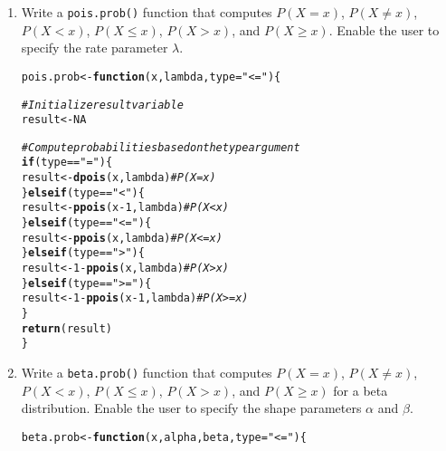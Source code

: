 \documentclass{article}\usepackage[]{graphicx}\usepackage[]{xcolor}
\makeatletter
\newcommand{\hlnum}[1]{\textcolor[rgb]{0.686,0.059,0.569}{#1}}%
\newcommand{\hlsng}[1]{\textcolor[rgb]{0.192,0.494,0.8}{#1}}%
\newcommand{\hlcom}[1]{\textcolor[rgb]{0.678,0.584,0.686}{\textit{#1}}}%
\newcommand{\hlopt}[1]{\textcolor[rgb]{0,0,0}{#1}}%
\newcommand{\hldef}[1]{\textcolor[rgb]{0.345,0.345,0.345}{#1}}%
\newcommand{\hlkwa}[1]{\textcolor[rgb]{0.161,0.373,0.58}{\textbf{#1}}}%
\newcommand{\hlkwb}[1]{\textcolor[rgb]{0.69,0.353,0.396}{#1}}%
\newcommand{\hlkwc}[1]{\textcolor[rgb]{0.333,0.667,0.333}{#1}}%
\newcommand{\hlkwd}[1]{\textcolor[rgb]{0.737,0.353,0.396}{\textbf{#1}}}%
\newenvironment{kframe}{%
 \def\at@end@of@kframe{}%
 \ifinner\ifhmode%
  \def\at@end@of@kframe{\end{minipage}}%
  \begin{minipage}{\columnwidth}%
 \fi\fi%
 \def\FrameCommand##1{\hskip\@totalleftmargin \hskip-\fboxsep
 \colorbox{shadecolor}{##1}\hskip-\fboxsep
     \hskip-\linewidth \hskip-\@totalleftmargin \hskip\columnwidth}%
 \MakeFramed {\advance\hsize-\width
   \@totalleftmargin\z@ \linewidth\hsize
   \@setminipage}}%
 {\par\unskip\endMakeFramed%
 \at@end@of@kframe}
\newenvironment{knitrout}{}{} %
\makeatother
\begin{document}
  \begin{enumerate}
    \item Write a \texttt{pois.prob()} function that computes $P(X=x)$, 
    $P(X \neq x)$, $P(X<x)$, $P(X \leq x)$, $P(X > x)$, and $P(X \geq x).$ Enable the user to specify the rate parameter $\lambda$.
\begin{knitrout}\scriptsize
{}\color{fgcolor}\begin{kframe}
\begin{alltt}
\hldef{pois.prob} \hlkwb{<-} \hlkwa{function}\hldef{(}\hlkwc{x}\hldef{,} \hlkwc{lambda}\hldef{,} \hlkwc{type}\hldef{=}\hlsng{"<="}\hldef{) \{}

  \hlcom{# Initialize result variable}
  \hldef{result} \hlkwb{<-} \hlnum{NA}

  \hlcom{# Compute probabilities based on the type argument}
  \hlkwa{if} \hldef{(type} \hlopt{==} \hlsng{"="}\hldef{) \{}
    \hldef{result} \hlkwb{<-} \hlkwd{dpois}\hldef{(x, lambda)}  \hlcom{# P(X = x)}
  \hldef{\}} \hlkwa{else if} \hldef{(type} \hlopt{==} \hlsng{"<"}\hldef{) \{}
    \hldef{result} \hlkwb{<-} \hlkwd{ppois}\hldef{(x} \hlopt{-} \hlnum{1}\hldef{, lambda)}  \hlcom{# P(X < x)}
  \hldef{\}} \hlkwa{else if} \hldef{(type} \hlopt{==} \hlsng{"<="}\hldef{) \{}
    \hldef{result} \hlkwb{<-} \hlkwd{ppois}\hldef{(x, lambda)}  \hlcom{# P(X <= x)}
  \hldef{\}} \hlkwa{else if} \hldef{(type} \hlopt{==} \hlsng{">"}\hldef{) \{}
    \hldef{result} \hlkwb{<-} \hlnum{1} \hlopt{-} \hlkwd{ppois}\hldef{(x, lambda)}  \hlcom{# P(X > x)}
  \hldef{\}} \hlkwa{else if} \hldef{(type} \hlopt{==} \hlsng{">="}\hldef{) \{}
    \hldef{result} \hlkwb{<-} \hlnum{1} \hlopt{-} \hlkwd{ppois}\hldef{(x} \hlopt{-} \hlnum{1}\hldef{, lambda)}  \hlcom{# P(X >= x)}
  \hldef{\}}
  \hlkwd{return}\hldef{(result)}
\hldef{\}}
\end{alltt}
\end{kframe}
\end{knitrout}
    \item Write a \texttt{beta.prob()} function that computes $P(X=x)$, 
    $P(X \neq x)$, $P(X<x)$, $P(X \leq x)$, $P(X > x)$, and $P(X \geq x)$
    for a beta distribution. Enable the user to specify the shape parameters
    $\alpha$ and $\beta$.
\begin{knitrout}\scriptsize
{}\color{fgcolor}\begin{kframe}
\begin{alltt}
\hldef{beta.prob} \hlkwb{<-} \hlkwa{function}\hldef{(}\hlkwc{x}\hldef{,} \hlkwc{alpha}\hldef{,} \hlkwc{beta}\hldef{,} \hlkwc{type}\hldef{=}\hlsng{"<="}\hldef{) \{}


\end{alltt}
\end{kframe}
\end{knitrout}
\end{enumerate}
\end{document}
